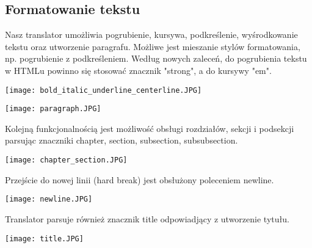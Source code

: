 \subsection{Formatowanie tekstu}

Nasz translator umożliwia pogrubienie, kursywa, podkreślenie, wyśrodkowanie tekstu oraz utworzenie paragrafu. Możliwe jest mieszanie
stylów formatowania, np. pogrubienie z podkreśleniem. Według nowych zaleceń, do pogrubienia tekstu w HTMLu powinno się stosować znacznik
"strong", a do kursywy "em".

\texttt{[image: bold\_italic\_underline\_centerline.JPG]}

\texttt{[image: paragraph.JPG]}

Kolejną funkcjonalnością jest możliwość obsługi rozdziałów, sekcji i podsekcji parsując znaczniki chapter, section, subsection, 
subsubsection.


\texttt{[image: chapter\_section.JPG]}


Przejście do nowej linii (hard break) jest obsłużony poleceniem newline.

\texttt{[image: newline.JPG]}


Translator parsuje również znacznik title odpowiadjący z utworzenie tytułu.

\texttt{[image: title.JPG]}